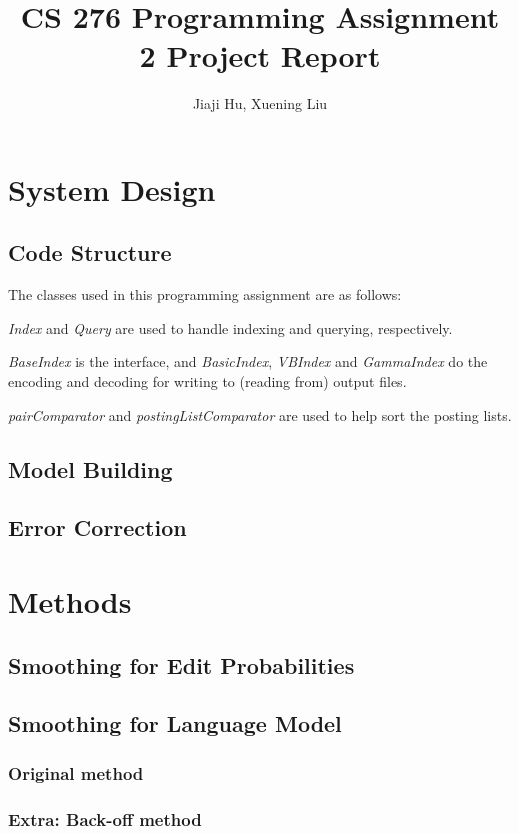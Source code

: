 \documentclass[10pt]{article}
\begin{document}
\title{CS 276 Programming Assignment 2 Project Report}
\author{Jiaji Hu, Xuening Liu}
\date{}
\maketitle

\section{System Design}
\subsection{Code Structure}
The classes used in this programming assignment are as follows:

{\it Index} and {\it Query} are used to handle indexing and querying, respectively.

{\it BaseIndex} is the interface, and {\it BasicIndex}, {\it VBIndex} and {\it GammaIndex} do the encoding and decoding for writing to (reading from) output files.

{\it pairComparator} and {\it postingListComparator} are used to help sort the posting lists.

\subsection{Model Building}

\subsection{Error Correction}

\section{Methods}
\subsection{Smoothing for Edit Probabilities}
\subsection{Smoothing for Language Model}
\subsubsection{Original method}
\subsubsection{Extra: Back-off method}
\cite{katz1987estimation}
\end{document}
